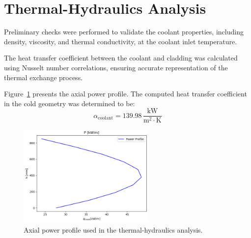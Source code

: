\section{Thermal-Hydraulics Analysis}
Preliminary checks were performed to validate the coolant properties, including density, viscosity, and thermal conductivity, at the coolant inlet temperature.

The heat transfer coefficient between the coolant and cladding was calculated using Nusselt number correlations, ensuring accurate representation of the thermal exchange process.

Figure~\ref{fig:thermal_hydraulics} presents the axial power profile. The computed heat transfer coefficient in the cold geometry was determined to be:
\[
\alpha_{\text{coolant}} = 139.98 \, \frac{\text{kW}}{\text{m}^2 \cdot \text{K}}
\]

\begin{figure}[H]
    \centering
    \includegraphics[width=0.6\textwidth]{power_profile.png}
    \caption{Axial power profile used in the thermal-hydraulics analysis.}
    \label{fig:thermal_hydraulics}
\end{figure}
